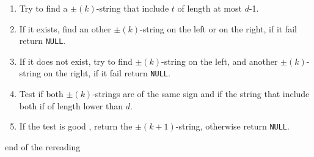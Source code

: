 \begin{itemize}
\begin{enumerate}
                    \begin{enumerate}
                        \item \label{alg:step3:1} Try to find a $\pm(k)$-string that include $t$ of length at most $d$-1.
                        \item \label{alg:step3:2} If it exists, find an other $\pm(k)$-string on the left or on the right, if it fail return \texttt{NULL}.
                        \item \label{alg:step3:3} If it does not exist, try to find $\pm(k)$-string on the left, and another $\pm(k)$-string on the right, if it fail return \texttt{NULL}.
                        \item \label{alg:step3:4} Test if both $\pm(k)$-strings are of the same sign and if the string that include both if of length lower than $d$.
                        \item \label{alg:step3:5} If the test is good , return the $\pm(k+1)$-string, otherwise return \texttt{NULL}.
                    \end{enumerate}
          \end{enumerate}

          {\color{red} end of the rereading}


\end{itemize}

